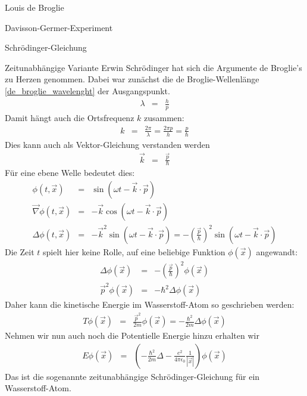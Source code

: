 \begin{chapter}{\titlestr}
\begin{section}{Louis de Broglie}
\begin{subsection}{Davisson-Germer-Experiment}
\end{subsection}
\end{section}

\begin{section}{Schrödinger-Gleichung}
\begin{subsection}{Zeitunabhängige Variante}
Erwin Schrödinger hat sich die Argumente de Broglie's zu Herzen genommen. Dabei war zunächst die de Broglie-Wellenlänge \ref{de_broglie_wavelenght} der Ausgangspunkt.
\begin{eqnarray*}
\lambda &=&\frac{h}{p}
\end{eqnarray*}
Damit hängt auch die Ortsfrequenz $k$ zusammen:
\begin{eqnarray*}
k &=& \frac{2\pi}{\lambda} = \frac{2\pi p}{h}=\frac{p}{\hbar}
\end{eqnarray*}
Dies kann auch als Vektor-Gleichung verstanden werden
\begin{eqnarray*}
\vec{k} &=&  \frac{\vec{p}}{\hbar}
\end{eqnarray*}
Für eine ebene Welle bedeutet dies:
\begin{eqnarray*}
\phi(t,\vec{x}) &=& \sin(\omega t-\vec{k}\cdot\vec{p})\\
\vec{\nabla}\phi(t,\vec{x}) &=& -\vec{k}\cos(\omega t-\vec{k}\cdot\vec{p})\\
\Delta\phi(t,\vec{x}) &=& -\vec{k}^2\sin(\omega t-\vec{k}\cdot\vec{p})=-\left(\frac{\vec{p}}{\hbar}\right)^2\sin(\omega t-\vec{k}\cdot\vec{p})
\end{eqnarray*}
Die Zeit $t$ spielt hier keine Rolle, auf eine beliebige Funktion $\phi(\vec{x})$ angewandt:
\begin{eqnarray*}
\Delta \phi(\vec{x}) &=&-\left(\frac{\vec{p}}{\hbar}\right)^2\phi(\vec{x})\\
\vec{p}^2\phi(\vec{x}) &=&-\hbar^2\Delta \phi(\vec{x})
\end{eqnarray*}
Daher kann die kinetische Energie im Wasserstoff-Atom so geschrieben werden:
\begin{eqnarray*}
T\phi(\vec{x})&=&\frac{\vec{p}^2}{2m}\phi(\vec{x})=-\frac{\hbar^2}{2m}\Delta\phi(\vec{x})
\end{eqnarray*}
Nehmen wir nun auch noch die Potentielle Energie hinzu erhalten wir
\begin{eqnarray*}
E\phi(\vec{x})&=&\left(-\frac{\hbar^2}{2m}\Delta-\frac{e^2}{4\pi\epsilon_0}\frac{1}{|\vec{x}|}\right)\phi(\vec{x})
\end{eqnarray*}
Das ist die sogenannte zeitunabhängige Schrödinger-Gleichung für ein Wasserstoff-Atom.

\end{subsection}
\end{section}
\end{chapter}
